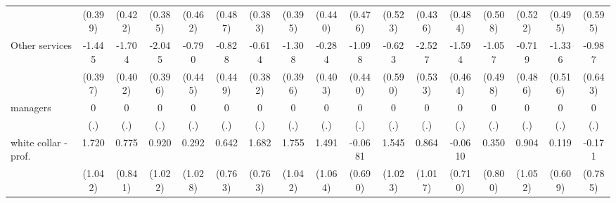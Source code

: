 {\begin{tabular}{l*{16}{c}}
                    &     (0.399)         &     (0.422)         &     (0.385)         &     (0.462)         &     (0.487)         &     (0.383)         &     (0.395)         &     (0.440)         &     (0.476)         &     (0.523)         &     (0.436)         &     (0.484)         &     (0.508)         &     (0.522)         &     (0.495)         &     (0.595)         \\
[1em]
Other services      &      -1.445\sym{***}&      -1.704\sym{***}&      -2.045\sym{***}&      -0.790         &      -0.828         &      -0.614         &      -1.308\sym{***}&      -0.284         &      -1.098\sym{*}  &      -0.623         &      -2.527\sym{***}&      -1.594\sym{***}&      -1.057\sym{*}  &      -0.719         &      -1.336\sym{**} &      -0.987         \\
                    &     (0.397)         &     (0.402)         &     (0.396)         &     (0.445)         &     (0.449)         &     (0.382)         &     (0.396)         &     (0.403)         &     (0.440)         &     (0.590)         &     (0.533)         &     (0.464)         &     (0.498)         &     (0.486)         &     (0.516)         &     (0.643)         \\
[1em]
managers            &           0         &           0         &           0         &           0         &           0         &           0         &           0         &           0         &           0         &           0         &           0         &           0         &           0         &           0         &           0         &           0         \\
                    &         (.)         &         (.)         &         (.)         &         (.)         &         (.)         &         (.)         &         (.)         &         (.)         &         (.)         &         (.)         &         (.)         &         (.)         &         (.)         &         (.)         &         (.)         &         (.)         \\
[1em]
white collar - prof.&       1.720         &       0.775         &       0.920         &       0.292         &       0.642         &       1.682\sym{*}  &       1.755         &       1.491         &     -0.0681         &       1.545         &       0.864         &     -0.0610         &       0.350         &       0.904         &       0.119         &      -0.171         \\
                    &     (1.042)         &     (0.841)         &     (1.022)         &     (1.028)         &     (0.763)         &     (0.763)         &     (1.042)         &     (1.064)         &     (0.690)         &     (1.023)         &     (1.017)         &     (0.710)         &     (0.800)         &     (1.052)         &     (0.609)         &     (0.785)         \\

\end{tabular}}
